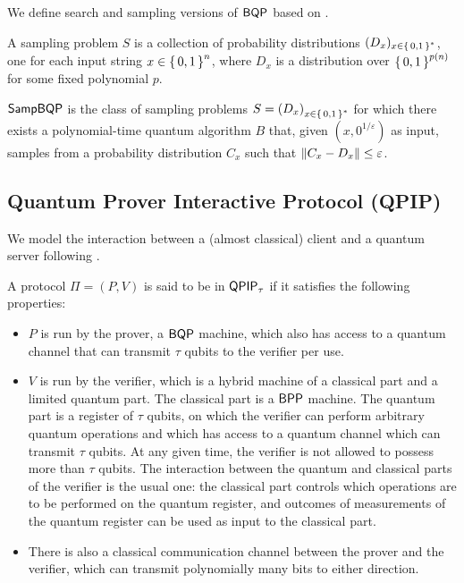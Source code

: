 
We define search and sampling versions of $\operatorname{\mathsf{BQP}}$ based on \cite{aaronson_2013}.

\begin{definition} 
	A sampling problem $S$ is a collection of probability distributions $(D_x)_{x\in\set{0, 1}^*}$, one for each input string $x\in\set{0,1}^n$, where $D_x$ is a distribution over $\set{0,1}^{p(n)}$ for some fixed polynomial $p$.
\end{definition}

\begin{definition} [$\SampBQP$]
	$\SampBQP$ is the class of sampling problems $S=\left(D_x\right)_{x\in\set{0, 1}^*}$ for which there exists a polynomial-time quantum algorithm $B$ that, given $(x, 0^{1/\varepsilon})$ as input, samples from a probability distribution $C_x$ such that $\left\lVert C_x-D_x\right\rVert\leq\varepsilon$.
\end{definition}

\subsection{Quantum Prover Interactive Protocol (QPIP)}
We model the interaction between a (almost classical) client and a quantum server following \cite{FOCS:Mahadev18a}.

\begin{definition}
	A protocol $\Pi=(P, V)$ is said to be in $\operatorname{\mathsf{QPIP}}_\tau$ if it satisfies the following properties:
	\begin{itemize}
		\item $P$ is run by the prover, a $\operatorname{\mathsf{BQP}}$ machine, which also has access to a quantum channel that can transmit $\tau$ qubits to the verifier per use.
		\item $V$ is run by the verifier, which is a hybrid machine of a classical part and a limited quantum part. The classical part is a $\operatorname{\mathsf{BPP}}$ machine. The quantum part is a register of $\tau$ qubits, on which the verifier can perform arbitrary quantum operations and which has access to a quantum channel which can transmit $\tau$ qubits. At any given time, the verifier is not allowed to possess more than $\tau$ qubits. The interaction between the quantum and classical parts of the verifier is the usual one: the classical part controls which operations are to be performed on the quantum register, and outcomes of measurements of the quantum register can be used as input to the classical part.
		\item There is also a classical communication channel between the prover and the verifier, which can transmit polynomially many bits to either direction. 
	\end{itemize}
\end{definition}

